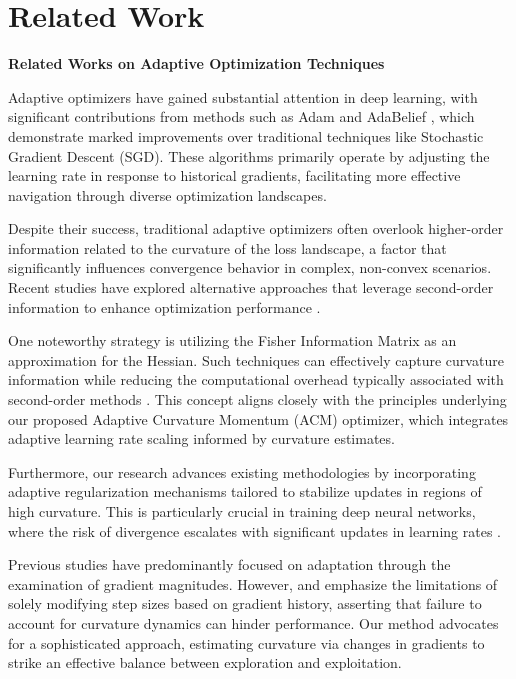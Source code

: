 \documentclass{article} %
\begin{document}

 


\section{Related Work}
\label{sec:related}
\noindent\textbf{Related Works on Adaptive Optimization Techniques}  

Adaptive optimizers have gained substantial attention in deep learning, with significant contributions from methods such as Adam \cite{kingma2014adam} and AdaBelief \cite{zbontar2020adaptive}, which demonstrate marked improvements over traditional techniques like Stochastic Gradient Descent (SGD). These algorithms primarily operate by adjusting the learning rate in response to historical gradients, facilitating more effective navigation through diverse optimization landscapes.  

Despite their success, traditional adaptive optimizers often overlook higher-order information related to the curvature of the loss landscape, a factor that significantly influences convergence behavior in complex, non-convex scenarios. Recent studies have explored alternative approaches that leverage second-order information to enhance optimization performance \cite{gaussnewton2020optim}.  

One noteworthy strategy is utilizing the Fisher Information Matrix as an approximation for the Hessian. Such techniques can effectively capture curvature information while reducing the computational overhead typically associated with second-order methods \cite{martens2010deep}. This concept aligns closely with the principles underlying our proposed Adaptive Curvature Momentum (ACM) optimizer, which integrates adaptive learning rate scaling informed by curvature estimates.  

Furthermore, our research advances existing methodologies by incorporating adaptive regularization mechanisms tailored to stabilize updates in regions of high curvature. This is particularly crucial in training deep neural networks, where the risk of divergence escalates with significant updates in learning rates \cite{chaudhari2019entropy}.  

Previous studies have predominantly focused on adaptation through the examination of gradient magnitudes. However, \cite{smith2017don't} and \cite{zhang2020adaptive} emphasize the limitations of solely modifying step sizes based on gradient history, asserting that failure to account for curvature dynamics can hinder performance. Our method advocates for a sophisticated approach, estimating curvature via changes in gradients to strike an effective balance between exploration and exploitation.  
\end{document}
